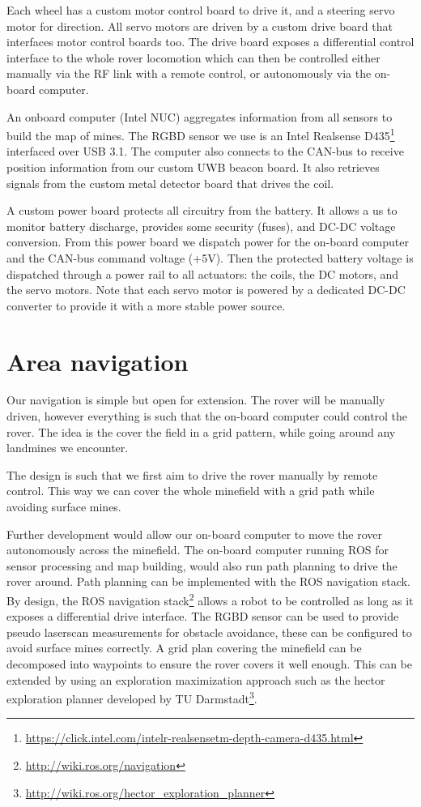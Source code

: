 Each wheel has a custom motor control board to drive it, and a steering servo motor for direction.
All servo motors are driven by a custom drive board that interfaces motor control boards too.
The drive board exposes a differential control interface to the whole rover locomotion which can then be controlled either manually via the RF link with a remote control, or autonomously via the on-board computer.

An onboard computer (Intel NUC) aggregates information from all sensors to build the map of mines.
The RGBD sensor we use is an Intel Realsense D435\footnote{\url{https://click.intel.com/intelr-realsensetm-depth-camera-d435.html}} interfaced over USB 3.1.
The computer also connects to the CAN-bus to receive position information from our custom UWB beacon board.
It also retrieves signals from the custom metal detector board that drives the coil.

A custom power board protects all circuitry from the battery.
It allows a us to monitor battery discharge, provides some security (fuses), and DC-DC voltage conversion.
From this power board we dispatch power for the on-board computer and the CAN-bus command voltage (+5V).
Then the protected battery voltage is dispatched through a power rail to all actuators: the coils, the DC motors, and the servo motors.
Note that each servo motor is powered by a dedicated DC-DC converter to provide it with a more stable power source.


\section{Area navigation}
Our navigation is simple but open for extension.
The rover will be manually driven, however everything is such that the on-board computer could control the rover.
The idea is the cover the field in a grid pattern, while going around any landmines we encounter.

The design is such that we first aim to drive the rover manually by remote control.
This way we can cover the whole minefield with a grid path while avoiding surface mines.

Further development would allow our on-board computer to move the rover autonomously across the minefield.
The on-board computer running ROS for sensor processing and map building, would also run path planning to drive the rover around.
Path planning can be implemented with the ROS navigation stack.
By design, the ROS navigation stack\footnote{\url{http://wiki.ros.org/navigation}} allows a robot to be controlled as long as it exposes a differential drive interface.
The RGBD sensor can be used to provide pseudo laserscan measurements for obstacle avoidance, these can be configured to avoid surface mines correctly.
A grid plan covering the minefield can be decomposed into waypoints to ensure the rover covers it well enough.
This can be extended by using an exploration maximization approach such as the hector exploration planner developed by TU Darmstadt\footnote{\url{http://wiki.ros.org/hector_exploration_planner}}.

